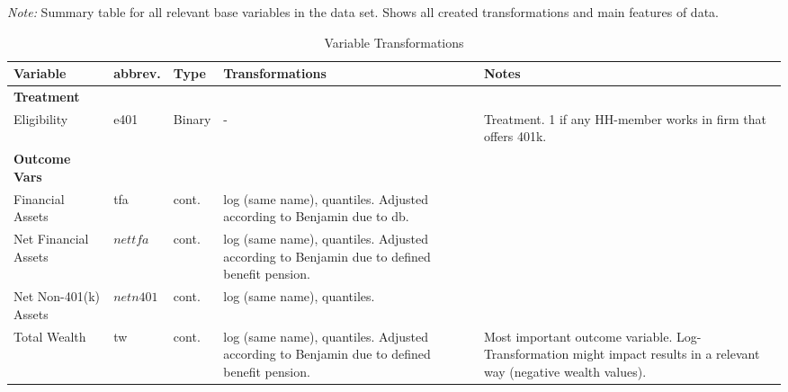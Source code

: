 \documentclass[12pt,a4paper]{article}
\begin{document}
\begin{landscape}
\begin{singlespace}
			\def\sym#1{\ifmmode^{#1}\else\(^{#1}\)\fi}
			\begin{ThreePartTable}
				\begin{TableNotes}
					\begin{scriptsize}
					\item \textit{Note:} Summary table for all relevant base variables in the data set. Shows all created transformations and main features of data. 	
					\end{scriptsize}
				\end{TableNotes}
				
				\begin{longtable}{l C{2cm} C{2cm} C{7cm} C{7cm} }
					\caption{Variable Transformations}\label{tab_variable_transformation}\\
					Variable & abbrev. & Type & Transformations & Notes   \\
					\midrule
					\textbf{Treatment} & & & & \\
					Eligibility & e401 & Binary & - & Treatment. 1 if any HH-member works in firm that offers 401k. \\
					\midrule
					\textbf{Outcome Vars} & & & & \\
					Financial Assets & tfa & cont. & log (same name), quantiles. Adjusted according to Benjamin due to db.  &	\\
					Net Financial Assets & $net tfa$ & cont.&  log (same name), quantiles. Adjusted according to Benjamin due to defined benefit pension.&	\\
					Net Non-401(k) Assets & $net n401$ & cont.&log (same name), quantiles. & \\
					Total Wealth & tw & cont.&  log (same name), quantiles. Adjusted according to Benjamin due to defined benefit pension. & Most important outcome variable. Log-Transformation might impact results in a relevant way (negative wealth values). \\


\end{longtable}
\end{ThreePartTable}
\end{singlespace}
\end{landscape}
\end{document}
